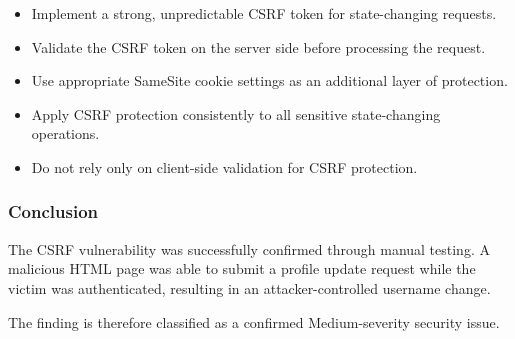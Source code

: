 \begin{itemize}

    \item Implement a strong, unpredictable CSRF token for
    state-changing requests.

    \item Validate the CSRF token on the server side before processing
    the request.

    \item Use appropriate SameSite cookie settings as an additional
    layer of protection.

    \item Apply CSRF protection consistently to all sensitive
    state-changing operations.

    \item Do not rely only on client-side validation for CSRF
    protection.

\end{itemize}

\subsubsection*{Conclusion}

The CSRF vulnerability was successfully confirmed through manual
testing. A malicious HTML page was able to submit a profile update
request while the victim was authenticated, resulting in an
attacker-controlled username change.

The finding is therefore classified as a confirmed Medium-severity
security issue.



